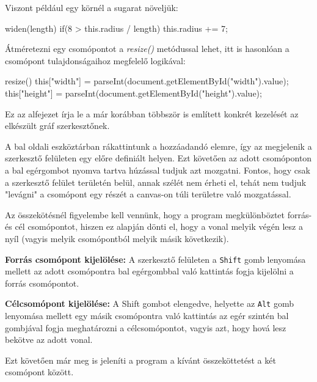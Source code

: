 Viszont például egy körnél a sugarat növeljük:

\begin{javascript}
widen(length){
   if(8 > this.radius / length)
   {
       this.radius += 7;
   }
}
\end{javascript}

Átméretezni egy csomópontot a \textit{resize()} metódussal lehet, itt is hasonlóan a csomópont tulajdonságaihoz megfelelő logikával:

\begin{javascript}
resize(){
   this["width"] = parseInt(document.getElementById("width").value);
   this["height"] =  parseInt(document.getElementById("height").value);
}
\end{javascript}

Ez az alfejezet írja le a már korábban többször is említett konkrét kezelését az elkészült gráf szerkesztőnek.


A bal oldali eszköztárban rákattintunk a hozzáadandó elemre, így az megjelenik a szerkesztő felületen egy előre definiált helyen. Ezt követően az adott csomóponton a bal egérgombot nyomva tartva húzással tudjuk azt mozgatni. Fontos, hogy csak a szerkesztő felület területén belül, annak szélét nem érheti el, tehát nem tudjuk "levágni" a csomópont egy részét a canvas-on túli területre való mozgatással.


Az összekötésnél figyelembe kell vennünk, hogy a program megkülönböztet forrás- és cél csomópontot, hiszen ez alapján dönti el, hogy a vonal melyik végén lesz a nyíl (vagyis melyik csomópontból melyik másik következik).

\textbf{Forrás csomópont kijelölése:} A szerkesztő felületen a \texttt{Shift} gomb lenyomása mellett az adott csomópontra bal egérgombbal való kattintás fogja kijelölni a forrás csomópontot.

\textbf{Célcsomópont kijelölése:} A Shift gombot elengedve, helyette az \texttt{Alt} gomb lenyomása mellett egy másik csomópontra való kattintás az egér szintén bal gombjával fogja meghatározni a célcsomópontot, vagyis azt, hogy hová lesz bekötve az adott vonal.

Ezt követően már meg is jeleníti a program a kívánt összeköttetést a két csomópont között.


